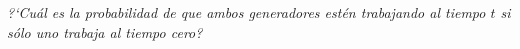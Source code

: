 \emph{
    ?`Cu\'al es la probabilidad de que ambos generadores est\'en trabajando al tiempo $t$ 
    si s\'olo uno trabaja al tiempo cero?\pn
}

\afterstatement\pn